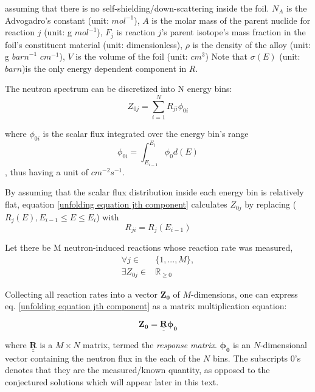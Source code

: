 \documentclass[a4paper, 12pt]{article}
\newcommand{\matr}[1]{\underline{\underline{\textbf{#1}}}}
\newcommand{\ve}[1]{\boldsymbol{#1}}
\begin{document}
assuming that there is no self-shielding/down-scattering inside the foil.
$N_A$ is the Advogadro's constant (unit: ${mol}^{-1}$),
$A$ is the molar mass of the parent nuclide for reaction $j$ (unit: g ${mol}^{-1}$),
$F_j$ is reaction $j$'s parent isotope's mass fraction in the foil's constituent material (unit: dimensionless),
$\rho$ is the density of the alloy (unit: g ${barn}^{-1}$ ${cm}^{-1}$),
$V$ is the volume of the foil (unit: ${cm}^3$) Note that $\sigma(E)$ (unit: $barn$)is the only energy dependent component in $R$. %

The neutron spectrum can be discretized into N energy bins:
\begin{equation} \label{unfolding equation jth component}
    Z_{0j}= \sum_{i=1}^{N} R_{ji} \phi_{0i}
\end{equation}

where $\phi_{0i}$ is the scalar flux integrated over the energy bin's range 
\begin{equation}
    \phi_{0i} = \int_{E_{i-1}}^{E_i} \phi_{0} d(E)
\end{equation}
, thus having a unit of $cm^{-2} s^{-1}$.

By assuming that the scalar flux distribution inside each energy bin is relatively flat, equation \ref{unfolding equation jth component} calculates $Z_{0j}$ by replacing ($R_j (E), E_{i-1}\le E\le E_{i}$) with 
\begin{equation}
    R_{ji}=R_j (E_{i-1})
\end{equation}

Let there be M neutron-induced reactions whose reaction rate was measured,
\begin{equation}
\begin{split}
    \forall j \in & \{ 1, ..., M \},  \\
    \exists Z_{0j} \in & \mathbb R_{\ge 0}
\end{split}
\end{equation}

Collecting all reaction rates into a vector $\ve{Z_0}$ of $M$-dimensions, one can express eq. \ref{unfolding equation jth component} as a matrix multiplication equation:
    
\begin{equation} \label{unfolding general equation}
\ve{Z_0}=\matr{R} \ve{\phi_0}
\end{equation}

where $\matr{R}$ is a $M\times N$ matrix, termed the \emph{response matrix}. $\ve{\phi_0}$ is an $N$-dimensional vector containing the neutron flux in the each of the $N$ bins. The subscripts 0's denotes that they are the measured/known quantity, as opposed to the conjectured solutions which will appear later in this text.
\end{document}
